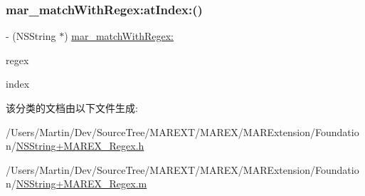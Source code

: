 \subsubsection{\texorpdfstring{mar\+\_\+match\+With\+Regex\+:at\+Index\+:()}{mar\_matchWithRegex:atIndex:()}}
{\footnotesize\ttfamily -\/ (N\+S\+String $\ast$) \hyperlink{category_n_s_string_07_m_a_r_e_x___matcher_08_ad175f09614f02f8b86eb2f6d367c3fa5}{mar\+\_\+match\+With\+Regex\+:} \begin{DoxyParamCaption}\item[{(N\+S\+String $\ast$)}]{regex }\item[{atIndex:(N\+S\+U\+Integer)}]{index }\end{DoxyParamCaption}}



该分类的文档由以下文件生成\+:\begin{DoxyCompactItemize}
\item 
/\+Users/\+Martin/\+Dev/\+Source\+Tree/\+M\+A\+R\+E\+X\+T/\+M\+A\+R\+E\+X/\+M\+A\+R\+Extension/\+Foundation/\hyperlink{_n_s_string_09_m_a_r_e_x___regex_8h}{N\+S\+String+\+M\+A\+R\+E\+X\+\_\+\+Regex.\+h}\item 
/\+Users/\+Martin/\+Dev/\+Source\+Tree/\+M\+A\+R\+E\+X\+T/\+M\+A\+R\+E\+X/\+M\+A\+R\+Extension/\+Foundation/\hyperlink{_n_s_string_09_m_a_r_e_x___regex_8m}{N\+S\+String+\+M\+A\+R\+E\+X\+\_\+\+Regex.\+m}\end{DoxyCompactItemize}

